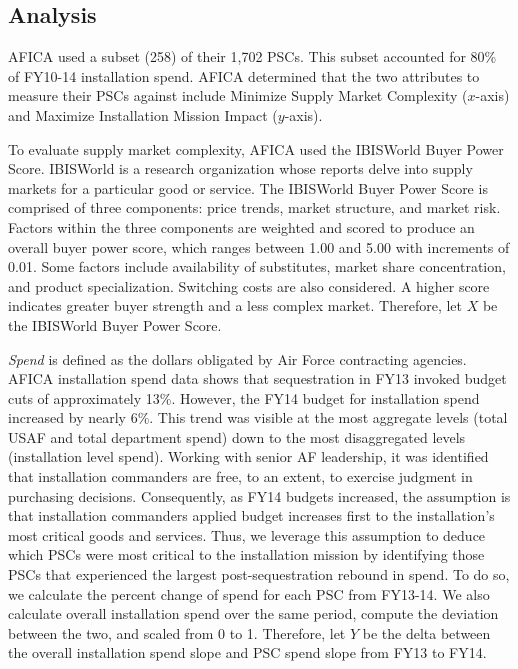 \documentclass[twocolumn]{svjour3}       %
\begin{document}
\subsection{Analysis}
\label{sec:5.2}

AFICA used a subset (258) of their 1,702 PSCs.  This subset accounted for 80\% of FY10-14 installation spend.  AFICA determined that the two attributes to measure their PSCs against include Minimize Supply Market Complexity ($x$-axis) and Maximize Installation Mission Impact ($y$-axis).

To evaluate supply market complexity, AFICA used the IBISWorld Buyer Power Score. IBISWorld is a research organization whose reports delve into supply markets for a particular good or service. The IBISWorld Buyer Power Score is comprised of three components: price trends, market structure, and market risk. Factors within the three components are weighted and scored to produce an overall buyer power score, which ranges between 1.00 and 5.00 with increments of 0.01. Some factors include availability of substitutes, market share concentration, and product specialization. Switching costs are also considered. A higher score indicates greater buyer strength and a less complex market. Therefore, let $X$ be the IBISWorld Buyer Power Score.

\textit{Spend} is defined as the dollars obligated by Air Force contracting agencies. AFICA installation spend data shows that sequestration in FY13 invoked budget cuts of approximately 13\%. However, the FY14 budget for installation spend increased by nearly 6\%. This trend was visible at the most aggregate levels (total USAF and total department spend) down to the most disaggregated levels (installation level spend). Working with senior AF leadership, it was identified that installation commanders are free, to an extent, to exercise judgment in purchasing decisions. Consequently, as FY14 budgets increased, the assumption is that installation commanders applied budget increases first to the installation's most critical goods and services. Thus, we leverage this assumption to deduce which PSCs were most critical to the installation mission by identifying those PSCs that experienced the largest post-sequestration rebound in spend. To do so, we calculate the percent change of spend for each PSC from FY13-14. We also calculate overall installation spend over the same period, compute the deviation between the two, and scaled from 0 to 1.  Therefore, let $Y$ be the delta between the overall installation spend slope and PSC spend slope from FY13 to FY14.
\end{document}

